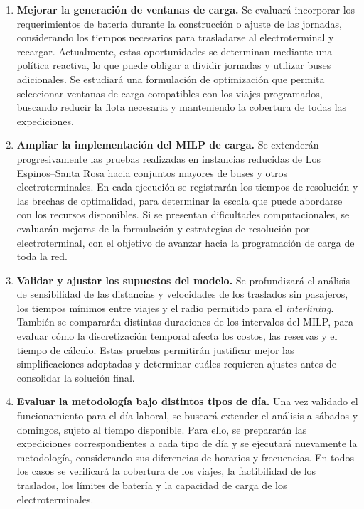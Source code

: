 \begin{enumerate}
    \emergencystretch=2em
    \renewcommand{\labelenumi}{(\roman{enumi})}

    \item \textbf{Mejorar la generación de ventanas de carga.}
    Se evaluará incorporar los requerimientos de batería durante la
    construcción o ajuste de las jornadas, considerando los tiempos
    necesarios para trasladarse al electroterminal y recargar.
    Actualmente, estas oportunidades se determinan mediante una política
    reactiva, lo que puede obligar a dividir jornadas y utilizar buses
    adicionales. Se estudiará una formulación de optimización que permita
    seleccionar ventanas de carga compatibles con los viajes programados,
    buscando reducir la flota necesaria y manteniendo la cobertura de
    todas las expediciones.

    \item \textbf{Ampliar la implementación del MILP de carga.}
    Se extenderán progresivamente las pruebas realizadas en instancias
    reducidas de Los Espinos--Santa Rosa hacia conjuntos mayores de buses
    y otros electroterminales. En cada ejecución se registrarán los tiempos
    de resolución y las brechas de optimalidad, para determinar la escala
    que puede abordarse con los recursos disponibles. Si se presentan
    dificultades computacionales, se evaluarán mejoras de la formulación
    y estrategias de resolución por electroterminal, con el objetivo de
    avanzar hacia la programación de carga de toda la red.

    \item \textbf{Validar y ajustar los supuestos del modelo.}
    Se profundizará el análisis de sensibilidad de las distancias y
    velocidades de los traslados sin pasajeros, los tiempos mínimos entre
    viajes y el radio permitido para el \textit{interlining}. También se
    compararán distintas duraciones de los intervalos del MILP, para
    evaluar cómo la discretización temporal afecta los costos, las
    reservas y el tiempo de cálculo. Estas pruebas permitirán justificar
    mejor las simplificaciones adoptadas y determinar cuáles requieren
    ajustes antes de consolidar la solución final.

    \item \textbf{Evaluar la metodología bajo distintos tipos de día.}
    Una vez validado el funcionamiento para el día laboral, se buscará
    extender el análisis a sábados y domingos, sujeto al tiempo disponible.
    Para ello, se prepararán las expediciones correspondientes a cada tipo
    de día y se ejecutará nuevamente la metodología, considerando sus
    diferencias de horarios y frecuencias. En todos los casos se verificará
    la cobertura de los viajes, la factibilidad de los traslados, los límites
    de batería y la capacidad de carga de los electroterminales.


\end{enumerate}
